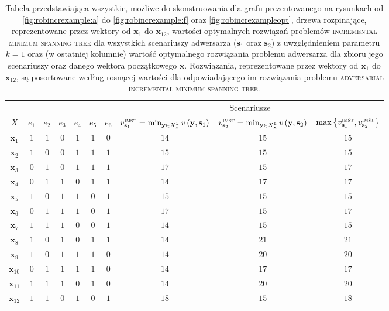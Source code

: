 \begin{table}[!htbp]
	\begin{tabular}{cccccccccc}
		\cline{8-10}
		\multicolumn{2}{l}{}       &         &         &         &         &         & \multicolumn{3}{c}{Scenariusze}                                                                                                                                                                                              \\
		$X$              & $e_{1}$ & $e_{2}$ & $e_{3}$ & $e_{4}$ & $e_{5}$ & $e_{6}$ & $v^{\textsc{imst}}_{\textbf{s}_{1}} = \min_{\textbf{y} \in X^{k}_{\textbf{x}}} v \left( \textbf{y}, \textbf{s}_{1} \right) $ & $v^{\textsc{imst}}_{\textbf{s}_{2}} = \min_{\textbf{y} \in X^{k}_{\textbf{x}}} v \left( \textbf{y}, \textbf{s}_{2} \right)$ & $\max \left\{ v^{\textsc{imst}}_{\textbf{s}_{1}}, v^{\textsc{imst}}_{\textbf{s}_{2}} \right\} $ \\
		$\textbf{x}_{1}$	&	$1$	&	$1$	&	$0$	&	$1$	&	$1$	&	$0$	&	$14$	&	$15$	&	$15$	\\
		$\textbf{x}_{2}$	&	$1$	&	$0$	&	$0$	&	$1$	&	$1$	&	$1$	&	$15$	&	$15$	&	$15$	\\
		$\textbf{x}_{3}$	&	$0$	&	$1$	&	$0$	&	$1$	&	$1$	&	$1$	&	$17$	&	$15$	&	$17$	\\
		$\textbf{x}_{4}$	&	$0$	&	$1$	&	$1$	&	$0$	&	$1$	&	$1$	&	$14$	&	$17$	&	$17$	\\
		$\textbf{x}_{5}$	&	$1$	&	$0$	&	$1$	&	$1$	&	$0$	&	$1$	&	$15$	&	$15$	&	$15$	\\
		$\textbf{x}_{6}$	&	$0$	&	$1$	&	$1$	&	$1$	&	$0$	&	$1$	&	$17$	&	$15$	&	$17$	\\
		$\textbf{x}_{7}$	&	$1$	&	$1$	&	$1$	&	$0$	&	$0$	&	$1$	&	$14$	&	$15$	&	$15$	\\
		$\textbf{x}_{8}$	&	$1$	&	$0$	&	$1$	&	$0$	&	$1$	&	$1$	&	$14$	&	$21$	&	$21$	\\
		$\textbf{x}_{9}$	&	$1$	&	$0$	&	$1$	&	$1$	&	$1$	&	$0$	&	$14$	&	$20$	&	$20$	\\
		$\textbf{x}_{10}$	&	$0$	&	$1$	&	$1$	&	$1$	&	$1$	&	$0$	&	$14$	&	$17$	&	$17$	\\
		$\textbf{x}_{11}$	&	$1$	&	$1$	&	$1$	&	$0$	&	$1$	&	$0$	&	$14$	&	$20$	&	$20$	\\
		$\textbf{x}_{12}$	&	$1$	&	$1$	&	$0$	&	$1$	&	$0$	&	$1$	&	$18$	&	$15$	&	$18$	\\
		\hline
	\end{tabular}
	\caption{
		Tabela przedstawiająca wszystkie, możliwe do skonstruowania dla grafu prezentowanego na rysunkach od \ref{fig:robincrexample:a} do \ref{fig:robincrexample:f} oraz \ref{fig:robincrexampleopt}, drzewa rozpinające, reprezentowane przez wektory od $\textbf{x}_{1}$ do $\textbf{x}_{12}$, wartości optymalnych rozwiązań problemów \textsc{incremental minimum spanning tree} dla wszystkich scenariuszy adwersarza ($\textbf{s}_{1}$ oraz $\textbf{s}_{2}$) z uwzględnieniem parametru $k = 1$ oraz (w ostatniej kolumnie) wartość optymalnego rozwiązania problemu adwersarza dla zbioru jego scenariuszy oraz danego wektora początkowego $\textbf{x}$. Rozwiązania, reprezentowane przez wektory od $\textbf{x}_{1}$ do $\textbf{x}_{12}$, są posortowane według rosnącej wartości dla odpowiadającego im rozwiązania problemu \textsc{adversarial incremental minimum spanning tree}.
}
\end{table}
